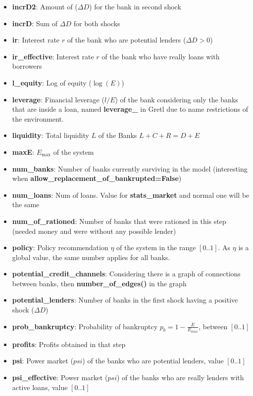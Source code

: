 \documentclass{article}
\begin{document}
\begin{itemize}
    \item \textbf{incrD2}: Amount of ($ \Delta D$) for the bank in second shock
    \item \textbf{incrD}: Sum of $ \Delta D$ for both shocks
    \item \textbf{ir}: Interest rate $r$ of the bank who are potential lenders ($\Delta D>0$)
    \item \textbf{ir\_effective}: Interest rate $r$ of the bank who have really loans with borrowers
    \item \textbf{l\_equity}: Log of equity ($\log(E)$)
    \item \textbf{leverage}: Financial leverage ($l/E$) of the bank considering only the banks that are inside a loan, named \textbf{leverage\_} in Gretl due to name restrictions of the environment.
    \item \textbf{liquidity}: Total liquidity $L$ of the Banks  $L + C + R = D + E$
    \item \textbf{maxE}: $E_{\max}$ of the system
    \item \textbf{num\_banks}: Number of banks currently surviving in the model (interesting when \textbf{allow\_replacement\_of\_bankrupted=False})
    \item \textbf{num\_loans}:  Num of loans. Value for \textbf{stats\_market} and normal one will be the same
    \item \textbf{num\_of\_rationed}: Number of banks that were rationed in this step (needed money and were without any possible lender)
    \item \textbf{policy}: Policy recommendation $\eta$ of the system in the range $[0..1]$. As $\eta$ is a global value, the same number applies for all banks.
    \item \textbf{potential\_credit\_channels}:  Considering there is a graph of connections between banks, then \textbf{number\_of\_edges()} in the graph
    \item \textbf{potential\_lenders}: Number of banks in the first shock having a positive shock ($ \Delta D$)
    \item \textbf{prob\_bankruptcy}: Probability of bankruptcy $p_b=1-\frac{E}{E_{max}}$, between $[0..1]$
    \item \textbf{profits}: Profits obtained in that step
    \item \textbf{psi}: Power market ($psi$) of the banks who are potential lenders, value $[0..1]$
    \item \textbf{psi\_effective}: Power market ($psi$) of the banks who are really lenders with active loans, value $[0..1]$

\end{itemize}
\end{document}
